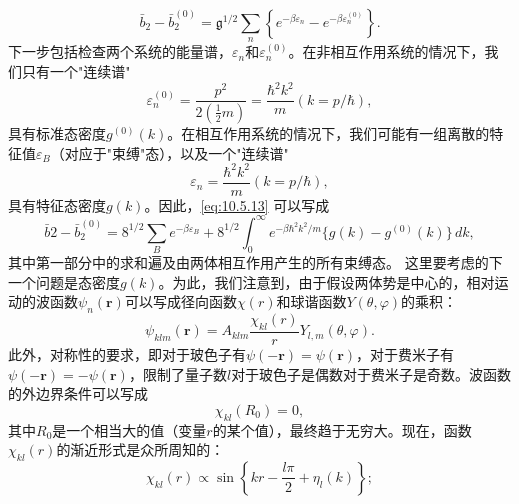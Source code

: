 \begin{equation}\tag{10.5.13}\label{eq:10.5.13}
\bar { b } _ { 2 } - \bar { b } _ { 2 } ^{( 0 )} = \mathfrak { g } ^{1 / 2} \sum _ { n } \left\{ e ^{- \beta \varepsilon _ { n} } - e ^{- \beta \varepsilon _ { n} ^{( 0 )} } \right\} .
\end{equation}
下一步包括检查两个系统的能量谱，\(\varepsilon_{n}\)和\(\varepsilon_{n}^{(0)}\)。在非相互作用系统的情况下，我们只有一个"连续谱"
\begin{equation}\tag{10.5.14}\label{eq:10.5.14}
\varepsilon _ { n } ^{( 0 )} = \frac { p ^{2} } { 2 \left( \frac { 1 } { 2 } m \right) } = \frac { \hbar ^{2} k ^{2} } { m }  ( k = p / \hbar ) ,
\end{equation}
具有标准态密度\(g^{(0)}(k)\)。在相互作用系统的情况下，我们可能有一组离散的特征值\(\varepsilon_B\)（对应于"束缚"态），以及一个"连续谱"
\begin{equation}\tag{10.5.15}\label{eq:10.5.15}
\varepsilon _ { n } = \frac { \hbar ^{2} k ^{2} } { m }  ( k = p / \hbar ) ,
\end{equation}
具有特征态密度\(g(k)\)。因此，\autoref{eq:10.5.13} 可以写成
\begin{equation}\tag{10.5.16}\label{eq:10.5.16}
\bar { b } 2 - \bar { b } _ { 2 } ^{( 0 )} = 8 ^{1 / 2} \sum _ { B } e ^{- \beta \varepsilon _ { B} } + 8 ^{1 / 2} \int _ { 0 } ^{\infty} e ^{- \beta \hbar ^ { 2} k ^{2} / m } \{ g ( k ) - g ^{( 0 )} ( k ) \} \, d k ,
\end{equation}
其中第一部分中的求和遍及由两体相互作用产生的所有束缚态。
这里要考虑的下一个问题是态密度\(g(k)\)。为此，我们注意到，由于假设两体势是中心的，相对运动的波函数\(\psi_{n}(\boldsymbol{r})\)可以写成径向函数\(\chi(r)\)和球谐函数\(Y(\theta, \varphi)\)的乘积：
\begin{equation}\tag{10.5.17}\label{eq:10.5.17}
\psi _ { k l m } ( \pmb { r } ) = A _ { k l m } \frac { \chi _ { k l } ( r ) } { r } Y _ { l , m } ( \theta , \varphi ) .
\end{equation}
此外，对称性的要求，即对于玻色子有\(\psi(-\boldsymbol{r})=\psi(\boldsymbol{r})\)，对于费米子有\(\psi(-\boldsymbol{r})=-\psi(\boldsymbol{r})\)，限制了量子数\(l\)对于玻色子是偶数对于费米子是奇数。波函数的外边界条件可以写成
\begin{equation}\tag{10.5.18}\label{eq:10.5.18}
\chi _ { k l } ( R _ { 0 } ) = 0 ,
\end{equation}
其中\(R_{0}\)是一个相当大的值（变量\(r\)的某个值），最终趋于无穷大。现在，函数\(\chi_{kl}(r)\)的渐近形式是众所周知的：
\begin{equation}\tag{10.5.19}\label{eq:10.5.19}
\chi _ { k l } ( r ) \propto \sin \left\{ k r - \frac { l \pi } { 2 } + \eta _ { l } ( k ) \right\} ;
\end{equation}
